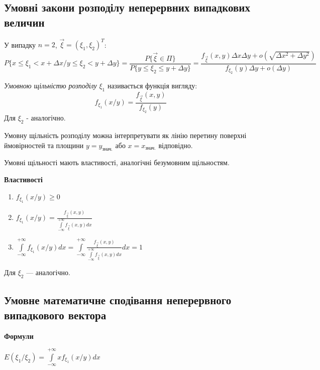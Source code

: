 \subsection{Умовні закони розподілу неперервних випадкових величин}

У випадку $n = 2$, $\vec{\xi} = (\xi_1, \xi_2)^T$: 
\begin{equation*}
    P\{x \leq \xi_1 < x + \Delta x / y \leq \xi_2 < y + \Delta y\} = 
    \frac{P\{\vec{\xi} \in \Pi\}}{P\{y \leq \xi_2 \leq y+\Delta y\}} = 
    \frac{f_{\vec{\xi}}(x,y)\Delta x \Delta y + 
    o(\sqrt{\Delta x^2 + \Delta y^2})}{f_{\xi_2}(y)\Delta y + o(\Delta y)}
\end{equation*}
\begin{definition}
    \emph{Умовною щільністю розподілу} $\xi_1$ називається функція 
    вигляду:
    \begin{equation*}
        f_{\xi_1}(x/y) = \frac{f_{\vec{\xi}}(x, y)}{f_{\xi_2}(y)}
    \end{equation*}
    Для $\xi_2$ - аналогічно.
\end{definition}

\begin{remark}
    Умовну щільність розподілу можна інтерпретувати як лінію перетину 
    поверхні ймовірностей та площини $y = y_{\text{знач.}}$ або
    $x = x_{\text{знач.}}$ відповідно.
\end{remark}

Умовні щільності мають властивості, аналогічні безумовним щільностям.

\noindent \textbf{Властивості}
\begin{enumerate}
    \item $f_{\xi_1}(x / y) \geq 0$
    \item $f_{\xi_1}(x/y) = \frac{f_{\vec{\xi}}(x,y)}
    {\int\limits_{-\infty}^{+\infty}f_{\vec{\xi}}(x,y)dx}$
    \item $\int\limits_{-\infty}^{+\infty} f_{\xi_1}(x / y) dx = 
    \int\limits_{-\infty}^{+\infty}\frac{f_{\vec{\xi}}(x,y)}
    {\int\limits_{-\infty}^{+\infty}f_{\vec{\xi}}(x,y)dx}dx = 1$
\end{enumerate}
Для $\xi_2$ --- аналогічно.

\subsection{Умовне математичне сподівання неперервного випадкового вектора}
\noindent \textbf{Формули}

$E(\xi_1 / \xi_2) = \int\limits_{-\infty}^{+\infty} xf_{\xi_1}(x/y)dx$

